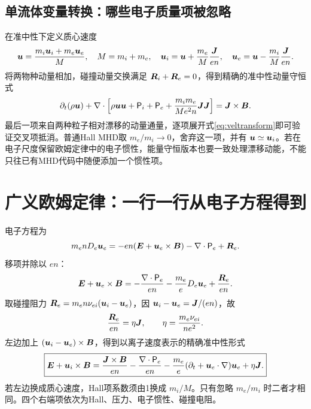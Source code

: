 \subsection{单流体变量转换：哪些电子质量项被忽略}
在准中性下定义质心速度
\begin{equation}\bm{u}={m_i\bm{u}_i+m_e\bm{u}_e\over M},\quad M=m_i+m_e,\quad
\bm{u}_i=\bm{u}+{m_e\over M}{\bm{J}\over en},\quad
\bm{u}_e=\bm{u}-{m_i\over M}{\bm{J}\over en}.\label{eq:veltransform}\end{equation}
将两物种动量相加，碰撞动量交换满足 $\bm{R}_i+\bm{R}_e=0$，得到精确的准中性动量守恒式
\begin{equation}
\partial_t(\rho\bm{u})+\nabla\cdot\left[\rho\bm{u}\bm{u}+\mathsf P_i+\mathsf P_e+
{m_im_e\over M e^2n}\bm{J}\bm{J}\right]=\bm{J}\times\bm{B}.\label{eq:singlemom}
\end{equation}
最后一项来自两种粒子相对漂移的动量通量，逐项展开式\eqref{eq:veltransform}即可验证交叉项抵消。普通Hall MHD取 $m_e/m_i\to0$，舍弃这一项，并有 $\bm{u}\simeq\bm{u}_i$。若在电子尺度保留欧姆定律中的电子惯性，能量守恒版本也要一致处理漂移动能，不能只往已有MHD代码中随便添加一个惯性项。



\section{广义欧姆定律：一行一行从电子方程得到}
电子方程为
\begin{equation}m_enD_e\bm{u}_e=-en(\bm{E}+\bm{u}_e\times\bm{B})-\nabla\cdot\mathsf P_e+\bm{R}_e.
\end{equation}
移项并除以 $en$：
\begin{equation}\bm{E}+\bm{u}_e\times\bm{B}=-{\nabla\cdot\mathsf P_e\over en}-{m_e\over e}D_e\bm{u}_e+{\bm{R}_e\over en}.\label{eq:electronohm}\end{equation}
取碰撞阻力 $\bm{R}_e=m_en\nu_{ei}(\bm{u}_i-\bm{u}_e)$，因 $\bm{u}_i-\bm{u}_e=\bm{J}/(en)$，故
\begin{equation}{\bm{R}_e\over en}=\eta\bm{J},\qquad \eta={m_e\nu_{ei}\over ne^2}.
\end{equation}
左边加上 $(\bm{u}_i-\bm{u}_e)\times\bm{B}$，得到以离子速度表示的精确准中性形式
\begin{equation}
\boxed{\bm{E}+\bm{u}_i\times\bm{B}={\bm{J}\times\bm{B}\over en}-{\nabla\cdot\mathsf P_e\over en}
-{m_e\over e}(\partial_t+\bm{u}_e\cdot\nabla)\bm{u}_e+\eta\bm{J}.}\label{eq:gohm}
\end{equation}
若左边换成质心速度，Hall项系数须由1换成 $m_i/M$。只有忽略 $m_e/m_i$ 时二者才相同。四个右端项依次为Hall、压力、电子惯性、碰撞电阻。

